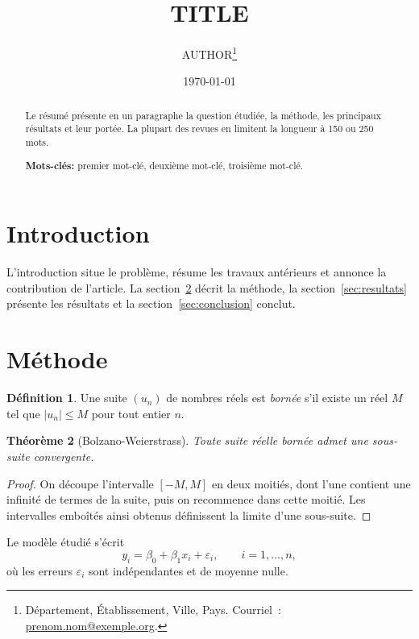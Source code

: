 \documentclass[11pt]{article}
\title{{{TITLE}}}
\author{%
  {{AUTHOR}}\thanks{Département, Établissement, Ville, Pays.
    Courriel~: \href{mailto:prenom.nom@exemple.org}{prenom.nom@exemple.org}.}%
}
\date{\today}
\newtheorem{theoreme}{Théorème}
\theoremstyle{definition}
\newtheorem{definition}[theoreme]{Définition}
\begin{document}
\maketitle

\begin{abstract}
Le résumé présente en un paragraphe la question étudiée, la méthode, les
principaux résultats et leur portée. La plupart des revues en limitent la
longueur à 150 ou 250 mots.

\medskip
\noindent\textbf{Mots-clés:} premier mot-clé, deuxième mot-clé, troisième
mot-clé.
\end{abstract}

\section{Introduction}
\label{sec:introduction}

L'introduction situe le problème, résume les travaux antérieurs
\parencite{knuth1981, lamport1994} et annonce la contribution de l'article. La
section~\ref{sec:methode} décrit la méthode, la section~\ref{sec:resultats}
présente les résultats et la section~\ref{sec:conclusion} conclut.

\section{Méthode}
\label{sec:methode}

\begin{definition}
Une suite $(u_n)$ de nombres réels est \emph{bornée} s'il existe un réel $M$
tel que $\lvert u_n \rvert \le M$ pour tout entier $n$.
\end{definition}

\begin{theoreme}[Bolzano-Weierstrass]
\label{thm:bw}
Toute suite réelle bornée admet une sous-suite convergente.
\end{theoreme}

\begin{proof}
On découpe l'intervalle $[-M, M]$ en deux moitiés, dont l'une contient une
infinité de termes de la suite, puis on recommence dans cette moitié. Les
intervalles emboîtés ainsi obtenus définissent la limite d'une sous-suite.
\end{proof}

Le modèle étudié s'écrit
\begin{equation}
  \label{eq:modele}
  y_i = \beta_0 + \beta_1 x_i + \varepsilon_i, \qquad i = 1, \dots, n,
\end{equation}
où les erreurs $\varepsilon_i$ sont indépendantes et de moyenne nulle.
\end{document}

